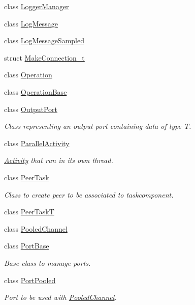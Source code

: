 \begin{DoxyCompactItemize}
class \hyperlink{classcoco_1_1_logger_manager}{Logger\+Manager}
\item 
class \hyperlink{classcoco_1_1_log_message}{Log\+Message}
\item 
class \hyperlink{classcoco_1_1_log_message_sampled}{Log\+Message\+Sampled}
\item 
struct \hyperlink{structcoco_1_1_make_connection__t}{Make\+Connection\+\_\+t}
\item 
class \hyperlink{classcoco_1_1_operation}{Operation}
\item 
class \hyperlink{classcoco_1_1_operation_base}{Operation\+Base}
\item 
class \hyperlink{classcoco_1_1_output_port}{Output\+Port}
\begin{DoxyCompactList}\small\item\em Class representing an output port containing data of type T. \end{DoxyCompactList}\item 
class \hyperlink{classcoco_1_1_parallel_activity}{Parallel\+Activity}
\begin{DoxyCompactList}\small\item\em \hyperlink{classcoco_1_1_activity}{Activity} that run in its own thread. \end{DoxyCompactList}\item 
class \hyperlink{classcoco_1_1_peer_task}{Peer\+Task}
\begin{DoxyCompactList}\small\item\em Class to create peer to be associated to taskcomponent. \end{DoxyCompactList}\item 
class \hyperlink{classcoco_1_1_peer_task_t}{Peer\+Task\+T}
\item 
class \hyperlink{classcoco_1_1_pooled_channel}{Pooled\+Channel}
\item 
class \hyperlink{classcoco_1_1_port_base}{Port\+Base}
\begin{DoxyCompactList}\small\item\em Base class to manage ports. \end{DoxyCompactList}\item 
class \hyperlink{classcoco_1_1_port_pooled}{Port\+Pooled}
\begin{DoxyCompactList}\small\item\em Port to be used with \hyperlink{classcoco_1_1_pooled_channel}{Pooled\+Channel}. \end{DoxyCompactList}\item 

\end{DoxyCompactItemize}
